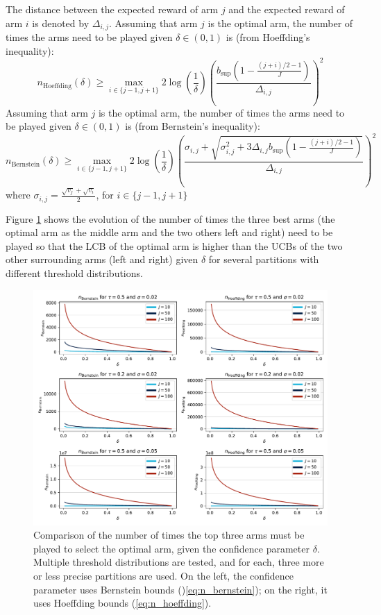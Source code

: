 \documentclass{statsmsc}
\begin{document}
The distance between the expected reward of arm $j$ and the expected reward of arm $i$ is denoted by $\Delta_{i,j}$. 
Assuming that arm $j$ is the optimal arm, the number of times the arms need to be played given $\delta \in (0,1)$ is (from Hoeffding's inequality):
\begin{equation}
  n_{\text{Hoeffding}}(\delta) \geq \max_{i \in \{j-1, j+1 \}} 2 \log\left(\frac{1}{\delta}\right)\left(\frac{b_{\sup}\left(1 - \frac{(j+i)/2 - 1}{J}\right)}{\Delta_{i,j}}\right)^2
  \label{eq:n_hoeffding}
\end{equation}
Assuming that arm $j$ is the optimal arm, the number of times the arms need to be played given $\delta \in (0,1)$ is (from Bernstein's inequality):
\begin{equation}
  n_{\text{Bernstein}}(\delta) \geq \max_{i \in \{j-1, j+1 \}} 2\log\left(\frac{1}{\delta}\right) \left(\frac{\sigma_{i,j} + \sqrt{\sigma_{i,j}^2 +3 \Delta_{i,j} b_{\sup} (1 -\frac{ (j+i)/2 - 1}{J}) }}{\Delta_{i,j}}\right)^2
  \label{eq:n_bernstein}
\end{equation}
where $\sigma_{i,j} = \frac{\sqrt{v_j} + \sqrt{v_i}}{2}$, for $i \in \{j-1, j+1\}$

Figure \ref{fig:delta_test} shows the evolution of the number of times the three best arms (the optimal arm as the middle arm and the two others left and right) need to be played so that the LCB of the optimal arm is higher than the UCBs of the two other surrounding arms (left and right) given $\delta$ for several partitions with different threshold distributions.

\begin{figure}[htbp]
  \centering
  \includegraphics[width=\textwidth]{images/n_bernstein_hoeffding.pdf}
  \caption{Comparison of the number of times the top three arms must be played to select the optimal arm, given the confidence parameter $\delta$. Multiple threshold distributions are tested, and for each, three more or less precise partitions are used. On the left, the confidence parameter uses Bernstein bounds ()\ref{eq:n_bernstein}); on the right, it uses Hoeffding bounds (\ref{eq:n_hoeffding}).}
  \label{fig:delta_test}
\end{figure}
\end{document}
